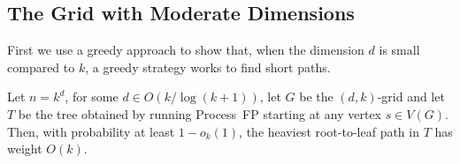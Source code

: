 \documentclass[lotsofwhite]{patmorin}
\begin{document}
\subsection{The Grid with Moderate Dimensions}

First we use a greedy approach to show that, when the dimension $d$
is small compared to $k$, a greedy strategy works to find short paths.

\begin{thm}
   Let $n=k^d$, for some $d\in O(k/\log(k+1))$, let $G$ be the $(d,k)$-grid
   and let $T$ be the tree obtained by running Process~FP starting at
   any vertex $s\in V(G)$.  Then, with probability at least $1-o_k(1)$,
   the heaviest root-to-leaf path in $T$ has weight $O(k)$.
\end{thm}
\end{document}
